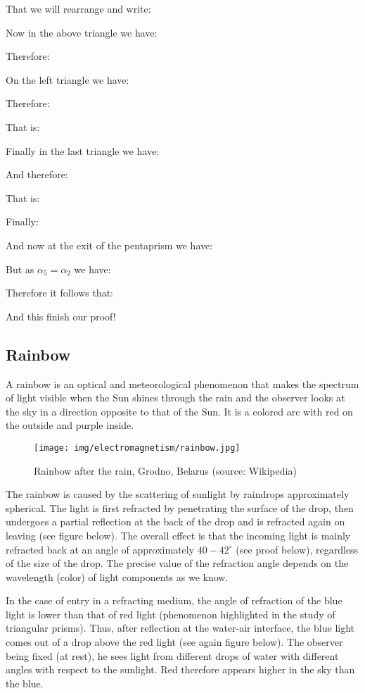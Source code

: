 	That we will rearrange and write:
	
	Now in the above triangle we have:
	
	Therefore:
	
	On the left triangle we have:
	
	Therefore:
	
	That is:
	
	Finally in the last triangle we have:
	
	And therefore:
	
	That is:
	
	Finally:
	
	And now at the exit of the pentaprism we have:
	
	But as $\alpha_5=\alpha_2$ we have:
	
	Therefore it follows that:
	
	And this finish our proof!
	
	\pagebreak
	\subsection{Rainbow}
	A rainbow is an optical and meteorological phenomenon that makes the spectrum of light visible  when the Sun shines through the rain and the observer looks at the sky in a direction opposite to that of the Sun. It is a colored arc with red on the outside and purple inside.
	\begin{figure}[H]
		\centering
		\texttt{[image: img/electromagnetism/rainbow.jpg]}
		\caption[]{Rainbow after the rain, Grodno, Belarus (source: Wikipedia)}
	\end{figure}
	The rainbow is caused by the scattering of sunlight by raindrops approximately spherical. The light is first refracted by penetrating the surface of the drop, then undergoes a partial reflection at the back of the drop and is refracted again on leaving (see figure below). The overall effect is that the incoming light is mainly refracted back at an angle of approximately $40-42^\circ$  (see proof below), regardless of the size of the drop. The precise value of the refraction angle depends on the wavelength (color) of light components as we know. 

	In the case of entry in a refracting medium, the angle of refraction of the blue light is lower than that of red light (phenomenon highlighted in the study of triangular prisms). Thus, after reflection at the water-air interface, the blue light comes out of a drop above the red light (see again figure below). The observer being fixed (at rest), he sees light from different drops of water with different angles with respect to the sunlight. Red therefore appears higher in the sky than the blue.
	
